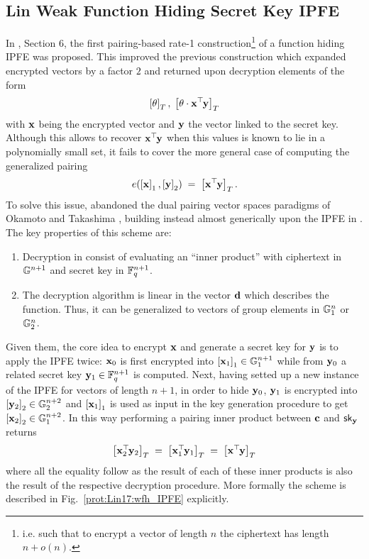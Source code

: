 
\newcommand{\IPsetup}{\cd{IP.Setup}}
\newcommand{\IPenc}{\cd{IP.Enc}}
\newcommand{\IPkeygen}{\cd{IP.KeyGen}}
\newcommand{\IPdec}{\cd{IP.Dec}}



\subsection{Lin Weak Function Hiding Secret Key IPFE}
In \cite{C:Lin17}, Section 6, the first pairing-based rate-1 construction\footnote{i.e. such that to encrypt a vector of length $n$ the ciphertext has length $n + o(n)$.} of a function hiding IPFE was proposed.
This improved the previous construction \cite{AC:BisJaiKow15} which expanded encrypted vectors by a factor $2$ and returned upon decryption elements of the form
\[
	\gexp{T}{\theta}
		, \;
	\gexp{T}{\theta \cdot \vc{x}^\trs \vc{y}}
\]
with $\vc{x}$ being the encrypted vector and $\vc{y}$ the vector linked to the secret key.
Although this allows to recover $\vc{x}^\trs \vc{y}$ when this values is known to lie in a polynomially small set, it fails to cover the more general case of computing the generalized pairing
\[
	e(\gexp{1}{\vc{x}}, \gexp{2}{\vc{y}})
		\; = \;
	\gexp{T}{\vc{x}^\trs \vc{y}}.
\]
%
To solve this issue, \cite{C:Lin17} abandoned the dual pairing vector spaces paradigms of Okamoto and Takashima \cite{PAIRING:OkaTak08, AC:OkaTak09}, building instead almost generically upon the IPFE in \cite{PKC:ABDP15}.
The key properties of this scheme are:
\begin{enumerate}
	\item Decryption in \cite{PKC:ABDP15} consist of evaluating an ``inner product'' with ciphertext in $\G^{n+1}$ and secret key in $\F_q^{n+1}$.
	
	\item The decryption algorithm is linear in the vector $\vc{d}$ which describes the function.
	Thus, it can be generalized to vectors of group elements in $\G_1^n$ or $\G_2^n$.
\end{enumerate}
Given them, the core idea to encrypt $\vc{x}$ and generate a secret key for $\vc{y}$ is to apply the IPFE twice: 
$\vc{x}_0$ is first encrypted into $\gexp{1}{\vc{x}_1} \in \G_1^{n+1}$ while from $\vc{y}_0$ a related secret key $\vc{y}_1 \in \F_q^{n+1}$ is computed.
Next, having setted up a new instance of the IPFE for vectors of length $n+1$, in order to hide $\vc{y}_0$, $\vc{y}_1$ is encrypted into $\gexp{2}{\vc{y}_2} \in \G_2^{n+2}$ and $\gexp{1}{\vc{x}_1}$ is used as input in the key generation procedure to get $\gexp{2}{\vc{x}_2} \in \G_1^{n+2}$.
In this way performing a pairing inner product between $\vc{c}$ and $\sk_\vc{y}$ returns
\[
	\gexp{T}{\vc{x}_2^\trs \vc{y}_2}
		\; = \;
	\gexp{T}{\vc{x}_1^\trs \vc{y}_1}
		\; = \;
	\gexp{T}{\vc{x}^\trs \vc{y}}
\]
where all the equality follow as the result of each of these inner products is also the result of the respective decryption procedure.
More formally the scheme is described in Fig.~\ref{prot:Lin17:wfh_IPFE} explicitly.

